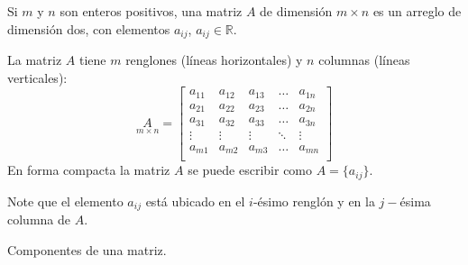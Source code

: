 \begin{definition}[Matriz] Si $m$ y $n$ son enteros positivos, una matriz $A$ de dimensión $m\times n$ es un arreglo de dimensión dos, con elementos $a_{ij}$, $a_{ij} \in \mathbb{R}$.
\end{definition}

La matriz $A$ tiene $m$ renglones (líneas horizontales) y $n$ columnas (líneas verticales):\\
$$
\underset{m \times n}A=\begin{bmatrix}
    a_{11} & a_{12} & a_{13} & \dots & a_{1n} \\
    a_{21} & a_{22} & a_{23} & \dots & a_{2n} \\
    a_{31} & a_{32} & a_{33} & \dots & a_{3n} \\
    \vdots & \vdots & \vdots & \ddots & \vdots \\
    a_{m1} & a_{m2} & a_{m3} & \dots & a_{mn} \\
  \end{bmatrix}
$$ En forma compacta la matriz $A$ se puede escribir como
$A=\{a_{ij}\}$.\\

\begin{remark}
Note que el elemento $a_{ij}$ está ubicado en el $i$-ésimo renglón y en la $j-$ésima columna de $A$.
\end{remark}
Componentes de una matriz.\\



